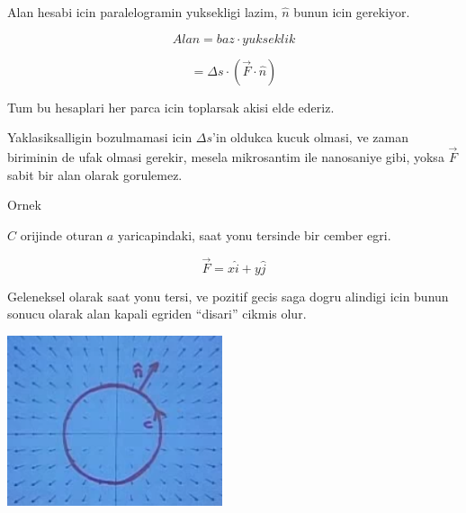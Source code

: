 \documentclass[12pt,fleqn]{article}
\begin{document}
Alan hesabi icin paralelogramin yuksekligi lazim, $\hat{n}$ bunun icin
gerekiyor. 

\[ Alan  = baz \cdot yukseklik \]

\[ = \Delta s \cdot (\vec{F} \cdot \hat{n} )\]

Tum bu hesaplari her parca icin toplarsak akisi elde ederiz. 

Yaklasiksalligin bozulmamasi icin $\Delta s$'in oldukca kucuk olmasi, ve
zaman biriminin de ufak olmasi gerekir, mesela mikrosantim ile nanosaniye
gibi, yoksa $\vec{F}$ sabit bir alan olarak gorulemez. 

Ornek

$C$ orijinde oturan $a$ yaricapindaki, saat yonu tersinde bir cember egri. 

\[ \vec{F} = x\hat{i} + y\hat{j} \]

Geleneksel olarak saat yonu tersi, ve pozitif gecis saga dogru alindigi
icin bunun sonucu olarak alan kapali egriden ``disari'' cikmis olur. 

\includegraphics[height=5cm]{23_6.png}
\end{document}
